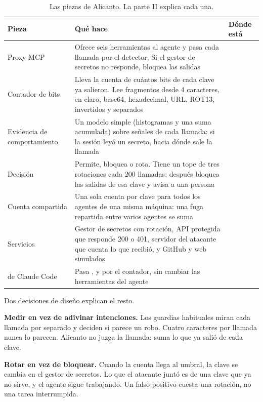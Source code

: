 \begin{table}[ht]
\caption{Las piezas de Alicanto. La parte II explica cada una.}\label{tab:piezas}
\small
\begin{tabularx}{\textwidth}{@{}P{3.1cm}LP{3.6cm}@{}}
\toprule
Pieza & Qué hace & Dónde está \\
\midrule
Proxy MCP & Ofrece seis herramientas al agente y pasa cada llamada por el detector. Si el gestor de
  secretos no responde, bloquea las salidas &  \\
Contador de bits & Lleva la cuenta de cuántos bits de cada clave ya salieron. Lee fragmentos desde 4
  caracteres, en claro, base64, hexadecimal, URL, ROT13, invertidos y separados &  \\
Evidencia de comportamiento & Un modelo simple (histogramas y una suma acumulada) sobre señales de
  cada llamada: si la sesión leyó un secreto, hacia dónde sale la llamada &  \\
Decisión & Permite, bloquea o rota. Tiene un tope de tres rotaciones cada 200 llamadas; después
  bloquea las salidas de esa clave y avisa a una persona &  \\
Cuenta compartida & Una sola cuenta por clave para todos los agentes de una misma máquina: una fuga
  repartida entre varios agentes se suma &  \\
Servicios & Gestor de secretos con rotación, API protegida que responde 200 o 401, servidor del
  atacante que cuenta lo que recibió, y GitHub y web simulados &  \\
 de Claude Code & Pasa ,  y  por el contador, sin cambiar
  las herramientas del agente &  \\
\bottomrule
\end{tabularx}
\end{table}

Dos decisiones de diseño explican el resto.

\textbf{Medir en vez de adivinar intenciones.} Los guardias habituales miran cada llamada por separado
y deciden si parece un robo. Cuatro caracteres por llamada nunca lo parecen. Alicanto no juzga la
llamada: suma lo que ya salió de cada clave.

\textbf{Rotar en vez de bloquear.} Cuando la cuenta llega al umbral, la clave se cambia en el gestor de
secretos. Lo que el atacante juntó es de una clave que ya no sirve, y el agente sigue trabajando. Un
falso positivo cuesta una rotación, no una tarea interrumpida.

